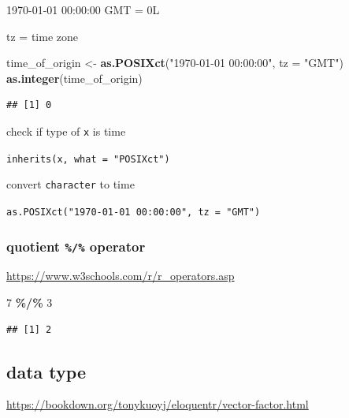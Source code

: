 \documentclass[
]{book}
\newenvironment{Shaded}{\begin{snugshade}}{\end{snugshade}}
\newcommand{\AttributeTok}[1]{\textcolor[rgb]{0.13,0.29,0.53}{#1}}
\newcommand{\DecValTok}[1]{\textcolor[rgb]{0.00,0.00,0.81}{#1}}
\newcommand{\FunctionTok}[1]{\textcolor[rgb]{0.13,0.29,0.53}{\textbf{#1}}}
\newcommand{\NormalTok}[1]{#1}
\newcommand{\OtherTok}[1]{\textcolor[rgb]{0.56,0.35,0.01}{#1}}
\newcommand{\SpecialCharTok}[1]{\textcolor[rgb]{0.81,0.36,0.00}{\textbf{#1}}}
\newcommand{\StringTok}[1]{\textcolor[rgb]{0.31,0.60,0.02}{#1}}
\theoremstyle{definition}
\theoremstyle{definition}
\theoremstyle{definition}
\theoremstyle{definition}
\theoremstyle{remark}
\begin{document}
1970-01-01 00:00:00 GMT = 0L

tz = time zone

\begin{Shaded}
\begin{Highlighting}[]
\NormalTok{time\_of\_origin }\OtherTok{\textless{}{-}} \FunctionTok{as.POSIXct}\NormalTok{(}\StringTok{"1970{-}01{-}01 00:00:00"}\NormalTok{, }\AttributeTok{tz =} \StringTok{"GMT"}\NormalTok{)}
\FunctionTok{as.integer}\NormalTok{(time\_of\_origin)}
\end{Highlighting}
\end{Shaded}

\begin{verbatim}
## [1] 0
\end{verbatim}

check if type of \texttt{x} is time

\texttt{inherits(x,\ what\ =\ "POSIXct")}

convert \texttt{character} to time

\texttt{as.POSIXct("1970-01-01\ 00:00:00",\ tz\ =\ "GMT")}

\subsubsection{\texorpdfstring{quotient \texttt{\%/\%} operator}{quotient \%/\% operator}}\label{quotient-operator}

\url{https://www.w3schools.com/r/r_operators.asp}

\begin{Shaded}
\begin{Highlighting}[]
\DecValTok{7} \SpecialCharTok{\%/\%} \DecValTok{3}
\end{Highlighting}
\end{Shaded}

\begin{verbatim}
## [1] 2
\end{verbatim}

\subsection{data type}\label{data-type}

\url{https://bookdown.org/tonykuoyj/eloquentr/vector-factor.html}
\end{document}
